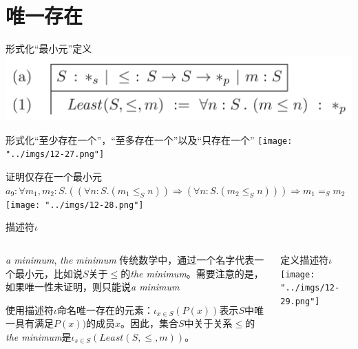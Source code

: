 \documentclass[UTF8,aspectratio=169,mathserif]{beamer}
\begin{document}
	\section{唯一存在}
		\begin{frame}[shrink]
			\begin{block}{{形式化“最小元”定义}}
				\includegraphics[width=\linewidth]{"../imgs/12-26.png"}
			\end{block}
			\begin{block}{形式化“至少存在一个”，“至多存在一个”以及“只存在一个”}
				\texttt{[image: "../imgs/12-27.png"]}
			\end{block}
		\end{frame}
		
		\begin{frame}{证明仅存在一个最小元}
			$a_9:\forall m_1,m_2:S.((\forall n:S.(m_1\le_S n))\Rightarrow(\forall n:S.(m_2\le_S n)))\Rightarrow m_1=_S m_2$
			\texttt{[image: "../imgs/12-28.png"]}
		\end{frame}
	
		\begin{frame}[shrink]{描述符$\iota$}
			\begin{columns}
				\begin{column}{0.5\textwidth}
					\begin{block}{\textit{a minimum}, \textit{the minimum}}
						传统数学中，通过一个名字代表一个最小元，比如说$S$关于$\le$的\textit{the minimum}。需要注意的是，如果唯一性未证明，则只能说\textit{a minimum}
					\end{block}
					
					使用描述符$\iota$命名唯一存在的元素：$\iota_{x\in S}(P(x))$表示$S$中唯一具有满足$P(x))$的成员$x$。因此，集合$S$中关于关系$\le$的\textit{the minimum}是$\iota_{s\in S}(Least(S,\le,m))$。
				\end{column}
				\begin{column}{0.5\textwidth}
					\begin{block}{定义描述符$\iota$}
						\texttt{[image: "../imgs/12-29.png"]}
					\end{block}
				\end{column}
			\end{columns}
		\end{frame}
	
\end{document}
